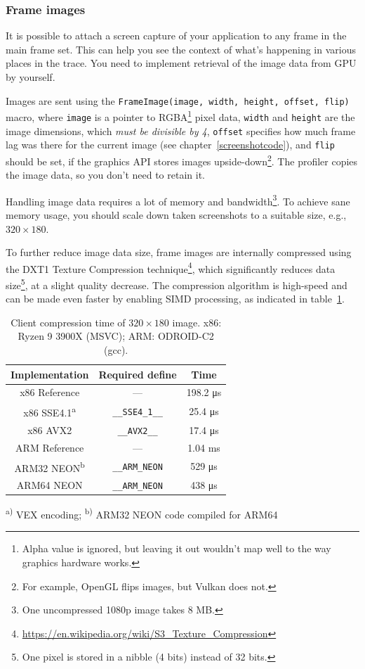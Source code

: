 \documentclass[hidelinks,titlepage,a4paper,twoside]{article}
\begin{document}
\subsubsection{Frame images}
\label{frameimages}

It is possible to attach a screen capture of your application to any frame in the main frame set. This can help you see the context of what's happening in various places in the trace. You need to implement retrieval of the image data from GPU by yourself.

Images are sent using the \texttt{FrameImage(image, width, height, offset, flip)} macro, where \texttt{image} is a pointer to RGBA\footnote{Alpha value is ignored, but leaving it out wouldn't map well to the way graphics hardware works.} pixel data, \texttt{width} and \texttt{height} are the image dimensions, which \emph{must be divisible by 4}, \texttt{offset} specifies how much frame lag was there for the current image (see chapter~\ref{screenshotcode}), and \texttt{flip} should be set, if the graphics API stores images upside-down\footnote{For example, OpenGL flips images, but Vulkan does not.}. The profiler copies the image data, so you don't need to retain it.

Handling image data requires a lot of memory and bandwidth\footnote{One uncompressed 1080p image takes 8 MB.}. To achieve sane memory usage, you should scale down taken screenshots to a suitable size, e.g., $320\times180$.

To further reduce image data size, frame images are internally compressed using the DXT1 Texture Compression technique\footnote{\url{https://en.wikipedia.org/wiki/S3_Texture_Compression}}, which significantly reduces data size\footnote{One pixel is stored in a nibble (4 bits) instead of 32 bits.}, at a slight quality decrease. The compression algorithm is high-speed and can be made even faster by enabling SIMD processing, as indicated in table~\ref{EtcSimd}.

\begin{table}[h]
\centering
\begin{tabular}[h]{c|c|c}
\textbf{Implementation} & \textbf{Required define} & \textbf{Time} \\ \hline
x86 Reference & --- & 198.2 \si{\micro\second} \\
x86 SSE4.1\textsuperscript{a} & \texttt{\_\_SSE4\_1\_\_} & 25.4 \si{\micro\second} \\
x86 AVX2 & \texttt{\_\_AVX2\_\_} & 17.4 \si{\micro\second} \\
ARM Reference & --- & 1.04 \si{\milli\second} \\
ARM32 NEON\textsuperscript{b} & \texttt{\_\_ARM\_NEON} & 529 \si{\micro\second} \\
ARM64 NEON & \texttt{\_\_ARM\_NEON} & 438 \si{\micro\second}
\end{tabular}

\vspace{1em}
\textsuperscript{a)} VEX encoding; \hspace{0.5em} \textsuperscript{b)} ARM32 NEON code compiled for ARM64
\caption{Client compression time of $320\times180$ image. x86: Ryzen 9 3900X (MSVC); ARM: ODROID-C2 (gcc).}
\label{EtcSimd}
\end{table}
\end{document}
